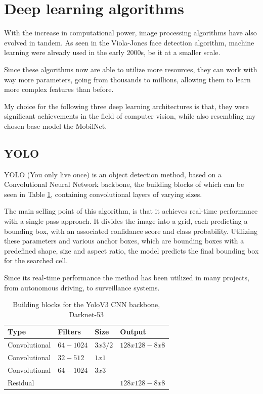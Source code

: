\section{Deep learning algorithms}
\label{sec:relatedsec2}
\par With the increase in computational power, image processing algorithms have also evolved in tandem. As seen in the Viola-Jones face detection algorithm, machine learning were already used in the early 2000s, be it at a smaller scale.
\par Since these algorithms now are able to utilize more resources, they can work with way more parameters, going from thousands to millions, allowing them to learn more complex features than before.
\par My choice for the following three deep learning architectures is that, they were significant achievements in the field of computer vision, while also resembling my chosen base model the MobilNet.

\subsection{YOLO}
\label{subsec:relatedsec2subsec1}
\par YOLO (You only live once) is an object detection method, based on a Convolutional Neural Network backbone, the building blocks of which can be seen in Table \ref{YoloTable}, containing convolutional layers of varying sizes.
\par The main selling point of this algorithm, is that it achieves real-time performance with a single-pass approach. It divides the image into a grid, each predicting a bounding box, with an associated confidance score and class probability. Utilizing these parameters and various anchor boxes, which are bounding boxes with a predefined shape, size and aspect ratio, the model predicts the final bounding box for the searched cell. \cite{redmon2018yolov3}
\par Since its real-time performance the method has been utilized in many projects, from autonomous driving, to surveillance systems.

\begin{table}[htbp]
\begin{center}
\begin{tabular}
{|p{90pt}|p{90pt}|p{90pt}|p{90pt}|}
\hline
 Type  &  Filters & Size & Output\\
\hline 
\hline Convolutional & $64-1024$ & $3x3/2$ & $128x128-8x8$ \\
\hline Convolutional & $32-512$ & $1x1$ & $ $ \\
\hline Convolutional & $64-1024$ & $3x3$ & $ $ \\
\hline Residual & $ $ & $ $ & $128x128-8x8$ \\
\hline
\end{tabular}
\end{center}
\caption{Building blocks for the YoloV3 CNN backbone, Darknet-53 \cite{redmon2018yolov3}}
\label{YoloTable}
\end{table}

